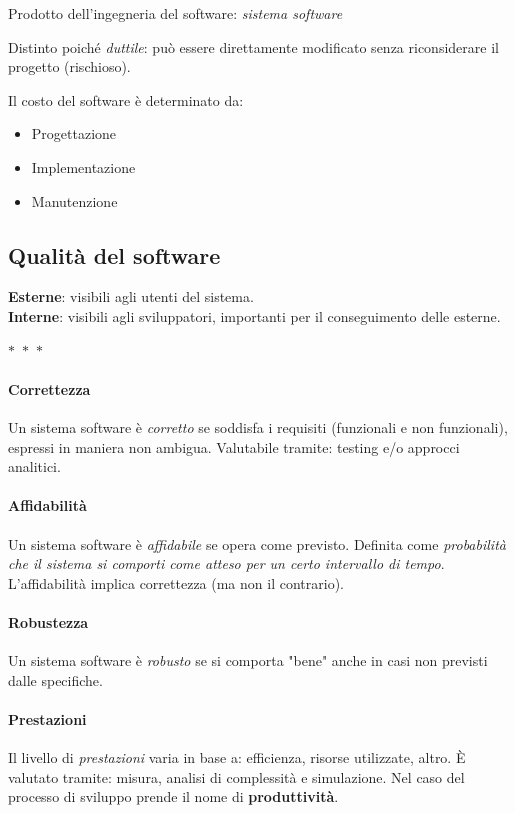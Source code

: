 Prodotto dell'ingegneria del software: \textit{sistema software}

Distinto poiché \textit{duttile}: può essere direttamente modificato senza riconsiderare il progetto (rischioso).

Il costo del software è determinato da:
\begin{itemize}
    \item Progettazione
    \item Implementazione
    \item Manutenzione
\end{itemize}

\subsection{Qualità del software}

\textbf{Esterne}: visibili agli utenti del sistema.\\
\textbf{Interne}: visibili agli sviluppatori, importanti per il conseguimento delle esterne.

\begin{center}
  $\ast$~$\ast$~$\ast$
\end{center}

\paragraph{Correttezza} Un sistema software è \textit{corretto} se soddisfa i requisiti (funzionali e non funzionali), espressi in maniera non ambigua. Valutabile tramite: testing e/o approcci analitici.

\paragraph{Affidabilità} Un sistema software è \textit{affidabile} se opera come previsto. Definita come \textit{probabilità che il sistema si comporti come atteso per un certo intervallo di tempo}. L'affidabilità implica correttezza (ma non il contrario).

\paragraph{Robustezza} Un sistema software è \textit{robusto} se si comporta "bene" anche in casi non previsti dalle specifiche.

\paragraph{Prestazioni} Il livello di \textit{prestazioni} varia in base a: efficienza, risorse utilizzate, altro. È valutato tramite: misura, analisi di complessità e simulazione. Nel caso del processo di sviluppo prende il nome di \textbf{produttività}.

